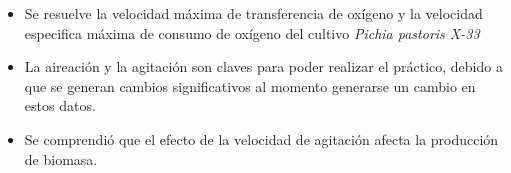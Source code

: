 \begin{itemize}
    \item Se resuelve la velocidad máxima de transferencia de oxígeno y la velocidad especifica máxima de consumo de oxígeno del cultivo \emph{Pichia pastoris X-33}
    \item La aireación y la agitación son claves para poder realizar el práctico, debido a que se generan cambios significativos al momento generarse un cambio en estos datos.
    \item Se comprendió que el efecto de la velocidad de agitación afecta la producción de biomasa.
    
\end{itemize}
